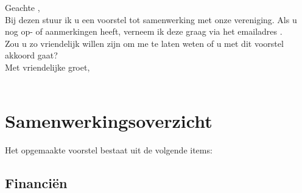 \documentclass[
 digital,         %
]{GEWISLetter}
\newcommand{\GEWIScontact}{%
\\%
}
\begin{document}
\GEWISfirstpage                 %
\printadresenkenmerk            %

Geachte %
,\\[2\baselineskip]
Bij dezen stuur ik u een voorstel tot samenwerking met onze vereniging. Als u nog op- of aanmerkingen heeft, verneem ik deze graag via het emailadres \href{mailto:%
}{%
}.\\[\baselineskip]
Zou u zo vriendelijk willen zijn om me te laten weten of u met dit voorstel akkoord gaat?\\[2\baselineskip]

Met vriendelijke groet,\\[2\baselineskip]
\GEWIScontact

\section{Samenwerkingsoverzicht}
Het opgemaakte voorstel bestaat uit de volgende items:
\subsection{Financi\"en}




\end{document}
